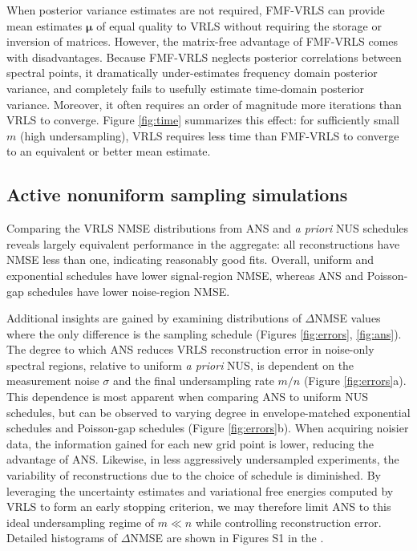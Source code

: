 \documentclass[final,5p,times,twocolumn]{elsarticle}
\newcommand{\m}[1]{\boldsymbol{#1}}
\begin{document}
When posterior variance estimates are not required, FMF-VRLS can provide
mean estimates $\m{\mu}$ of equal quality to VRLS without requiring the
storage or inversion of matrices. However, the matrix-free advantage of
FMF-VRLS comes with disadvantages. Because FMF-VRLS neglects posterior
correlations between spectral points, it dramatically under-estimates
frequency domain posterior variance, and completely fails to usefully
estimate time-domain posterior variance. Moreover, it often requires an
order of magnitude more iterations than VRLS to converge.
Figure \ref{fig:time} summarizes this effect: for sufficiently small
$m$ (high undersampling), VRLS requires less time than FMF-VRLS to
converge to an equivalent or better mean estimate.

\subsection{Active nonuniform sampling simulations}
\label{subsec:ansresults}
Comparing the VRLS NMSE distributions from ANS and \emph{a priori} NUS
schedules reveals largely equivalent performance in the aggregate: all
reconstructions have NMSE less than one, indicating reasonably good fits.
Overall, uniform and exponential schedules have lower signal-region NMSE,
whereas ANS and Poisson-gap schedules have lower noise-region NMSE.

Additional insights are gained by examining distributions of $\Delta$NMSE
values where the only difference is the sampling schedule (Figures
\ref{fig:errors}, \ref{fig:ans}). The degree to which ANS reduces VRLS
reconstruction error in noise-only spectral regions, relative to uniform
\emph{a priori} NUS, is dependent on the measurement noise $\sigma$ and
the final undersampling rate $m/n$ (Figure \ref{fig:errors}a). This
dependence is most apparent when comparing ANS to uniform NUS schedules,
but can be observed to varying degree in envelope-matched exponential
schedules and Poisson-gap schedules (Figure \ref{fig:errors}b). When
acquiring noisier data, the information gained for each new grid point
is lower, reducing the advantage of ANS. Likewise, in less aggressively
undersampled experiments, the variability of reconstructions due to the
choice of schedule is diminished. By leveraging the uncertainty estimates
and variational free energies computed by VRLS to form an early stopping
criterion, we may therefore limit ANS to this ideal undersampling regime
of $m \ll n$ while controlling reconstruction error. Detailed histograms
of $\Delta$NMSE are shown in Figures S1 in the .
\end{document}
